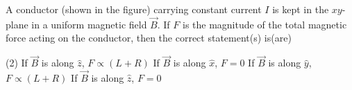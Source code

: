 
\item A conductor (shown in the figure) carrying constant current \(I\) is kept in the \(xy\)-plane in a uniform magnetic field \(\vec{B}\). If \(F\) is the magnitude of the total magnetic force acting on the conductor, then the correct statement(s) is(are)
\begin{center}
\end{center}
    \begin{tasks}(2)
        \task If \(\vec{B}\) is along \(\hat{z}\), \(F \propto (L + R)\)
        \task If \(\vec{B}\) is along \(\hat{x}\), \(F=0\)
        \task If \(\vec{B}\) is along \(\hat{y}\), \(F \propto (L + R)\)
        \task If \(\vec{B}\) is along \(\hat{z}\), \(F=0\)
    \end{tasks}



